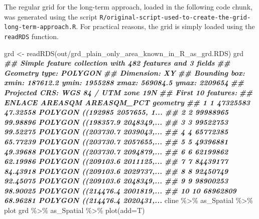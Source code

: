 \documentclass[10pt,landscape,a3paper]{article}
\newenvironment{Shaded}{\begin{snugshade}}{\end{snugshade}}
\newcommand{\AttributeTok}[1]{\textcolor[rgb]{0.77,0.63,0.00}{#1}}
\newcommand{\DocumentationTok}[1]{\textcolor[rgb]{0.56,0.35,0.01}{\textbf{\textit{#1}}}}
\newcommand{\FunctionTok}[1]{\textcolor[rgb]{0.00,0.00,0.00}{#1}}
\newcommand{\NormalTok}[1]{#1}
\newcommand{\OtherTok}[1]{\textcolor[rgb]{0.56,0.35,0.01}{#1}}
\newcommand{\SpecialCharTok}[1]{\textcolor[rgb]{0.00,0.00,0.00}{#1}}
\newcommand{\StringTok}[1]{\textcolor[rgb]{0.31,0.60,0.02}{#1}}
\begin{document}
The regular grid for the long-term approach, loaded in the following
code chunk, was generated using the script
\texttt{R/original-script-used-to-create-the-grid-long-term-approach.R}.
For practical reasons, the grid is simply loaded using the
\texttt{readRDS} function.

\begin{Shaded}
\begin{Highlighting}[]
\NormalTok{grd }\OtherTok{\textless{}{-}} \FunctionTok{readRDS}\NormalTok{(}\StringTok{\textquotesingle{}out/grd\_plain\_only\_area\_known\_in\_R\_as\_grd.RDS\textquotesingle{}}\NormalTok{)}
\NormalTok{grd}
\DocumentationTok{\#\# Simple feature collection with 482 features and 3 fields}
\DocumentationTok{\#\# Geometry type: POLYGON}
\DocumentationTok{\#\# Dimension:     XY}
\DocumentationTok{\#\# Bounding box:  xmin: 187612.2 ymin: 1955288 xmax: 569084.5 ymax: 2209654}
\DocumentationTok{\#\# Projected CRS: WGS 84 / UTM zone 19N}
\DocumentationTok{\#\# First 10 features:}
\DocumentationTok{\#\#    ENLACE  AREASQM AREASQM\_PCT                       geometry}
\DocumentationTok{\#\# 1       1 47325583    47.32558 POLYGON ((192985 2057655, 1...}
\DocumentationTok{\#\# 2       2 99988965    99.98896 POLYGON ((198357.9 2048349,...}
\DocumentationTok{\#\# 3       3 99522753    99.52275 POLYGON ((203730.7 2039043,...}
\DocumentationTok{\#\# 4       4 65772385    65.77239 POLYGON ((203730.7 2057655,...}
\DocumentationTok{\#\# 5       5 49396881    49.39688 POLYGON ((203730.7 2094879,...}
\DocumentationTok{\#\# 6       6 62199862    62.19986 POLYGON ((209103.6 2011125,...}
\DocumentationTok{\#\# 7       7 84439177    84.43918 POLYGON ((209103.6 2029737,...}
\DocumentationTok{\#\# 8       8 92450749    92.45075 POLYGON ((209103.6 2048349,...}
\DocumentationTok{\#\# 9       9 98900253    98.90025 POLYGON ((214476.4 2001819,...}
\DocumentationTok{\#\# 10     10 68962809    68.96281 POLYGON ((214476.4 2020431,...}
\NormalTok{cline }\SpecialCharTok{\%\textgreater{}\%}\NormalTok{ as\_Spatial }\SpecialCharTok{\%\textgreater{}\%}\NormalTok{ plot}
\NormalTok{grd }\SpecialCharTok{\%\textgreater{}\%}\NormalTok{ as\_Spatial }\SpecialCharTok{\%\textgreater{}\%} \FunctionTok{plot}\NormalTok{(}\AttributeTok{add=}\NormalTok{T)}
\end{Highlighting}
\end{Shaded}
\end{document}
